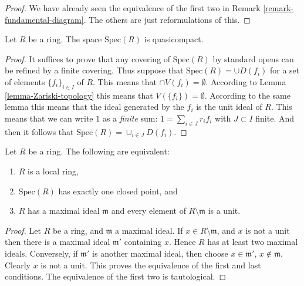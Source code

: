 \begin{proof}
We have already seen the equivalence of the first two
in Remark \ref{remark-fundamental-diagram}. The others
are just reformulations of this.
\end{proof}

\begin{lemma}
\label{lemma-quasicompact}
Let $R$ be a ring. The space $\text{Spec}(R)$ is quasicompact.
\end{lemma}

\begin{proof}
It suffices to prove that any covering of $\text{Spec}(R)$
by standard opens can be refined by a finite covering.
Thus suppose that $\text{Spec}(R) = \cup D(f_i)$
for a set of elements $\{f_i\}_{i\in I}$ of $R$. This means that
$\cap V(f_i) = \emptyset$. According to Lemma
\ref{lemma-Zariski-topology} this means that
$V(\{f_i \}) = \emptyset$. According to the
same lemma this means that the ideal generated
by the $f_i$ is the unit ideal of $R$. This means
that we can write $1$ as a {\it finite} sum:
$1 = \sum_{i \in J} r_i f_i$ with $J \subset I$ finite.
And then it follows that $\text{Spec}(R) 
= \cup_{i \in J} D(f_i)$.
\end{proof}


\begin{lemma}
\label{lemma-characterize-local-ring}
Let $R$ be a ring. The following are equivalent:
\begin{enumerate}
\item $R$ is a local ring,
\item $\text{Spec}(R)$ has exactly one closed point, and
\item $R$ has a maximal ideal $\mathfrak m$
and every element of $R \setminus \mathfrak m$
is a unit.
\end{enumerate}
\end{lemma}

\begin{proof}
Let $R$ be a ring, and $\mathfrak m$ a maximal ideal.
If $x \in R \setminus \mathfrak m$, and $x$ is not a unit
then there is a maximal ideal $\mathfrak m'$ containing
$x$. Hence $R$ has at least two maximal ideals. Conversely,
if $\mathfrak m'$ is another maximal ideal, then choose
$x \in \mathfrak m'$, $x \not \in \mathfrak m$. Clearly
$x$ is not a unit. This proves the equivalence of the
first and last conditions. The equivalence of the first
two is tautological.
\end{proof}



